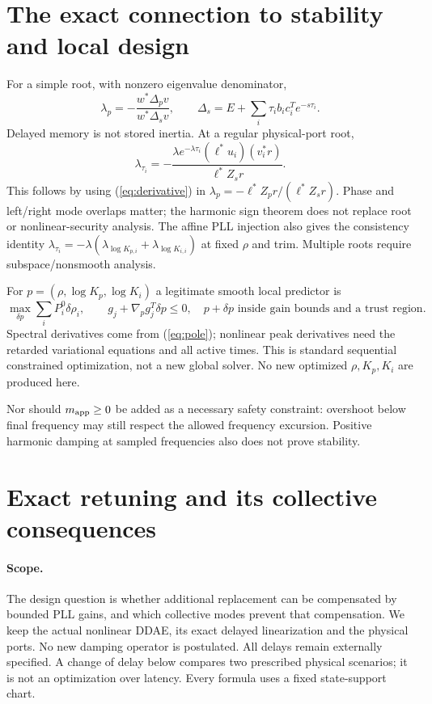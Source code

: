 \documentclass[11pt]{article}
\begin{document}
\section{The exact connection to stability and local design}
For a simple root, with nonzero eigenvalue denominator,
\[
 \lambda_p=-\frac{w^*\Delta_pv}{w^*\Delta_s v},\qquad
 \Delta_s=E+\sum_i\tau_i b_ic_i^T e^{-s\tau_i}.
\]
Delayed memory is not stored inertia. At a regular physical-port root,
\begin{equation}
 \boxed{\lambda_{\tau_i}
 =-\frac{\lambda e^{-\lambda\tau_i}
             (\ell^*u_i)(v_i^*r)}{\ell^*Z_s r}.} \label{eq:pole}
\end{equation}
This follows by using (\ref{eq:derivative}) in
$\lambda_p=-\ell^*Z_pr/(\ell^*Z_sr)$.
Phase and left/right mode overlaps matter; the harmonic sign theorem
does not replace root or nonlinear-security analysis.
The affine PLL injection also gives the consistency identity
$\lambda_{\tau_i}=-\lambda(\lambda_{\log K_{p,i}}+
\lambda_{\log K_{i,i}})$ at fixed $\rho$ and trim.
Multiple roots require subspace/nonsmooth analysis.

For $p=(\rho,\log K_p,\log K_i)$ a legitimate smooth local predictor is
\[
 \max_{\delta p}\sum_iP_i^0\delta\rho_i,\qquad
 g_j+\nabla_p g_j^T\delta p\leq0,
 \quad p+\delta p\text{ inside gain bounds and a trust region}.
\]
Spectral derivatives come from (\ref{eq:pole}); nonlinear peak
derivatives need the retarded variational equations and all active
times. This is standard sequential constrained optimization, not a
new global solver. No new optimized $\rho,K_p,K_i$ are produced here.

Nor should $m_{\rm app}\geq0$ be added as a necessary safety
constraint: overshoot below final frequency may still respect the
allowed frequency excursion. Positive harmonic damping at sampled
frequencies also does not prove stability.

\section{Exact retuning and its collective consequences}\label{sec:retuning}

\paragraph{Scope.}
The design question is whether additional replacement can be compensated
by bounded PLL gains, and which collective modes prevent that compensation.
We keep the actual nonlinear DDAE, its exact delayed linearization and
the physical ports. No new damping operator is postulated.
All delays remain externally specified. A change of delay below compares
two prescribed physical scenarios; it is not an optimization over latency.
Every formula uses a fixed state-support chart.
\end{document}
